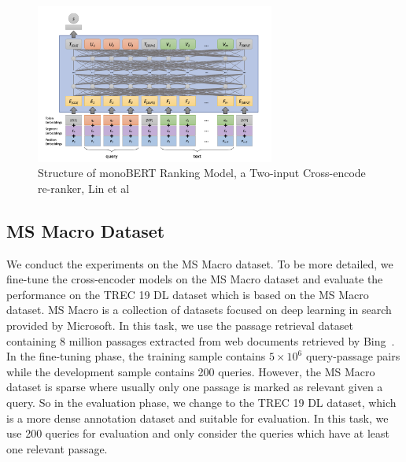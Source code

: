 \documentclass[acmsmall]{acmart}
\begin{document}
\begin{figure}[H]
    \centering
    \includegraphics[width=0.7\textwidth]
    {report/cross-encoder.png}
    \caption{Structure of monoBERT Ranking Model, a Two-input Cross-encode re-ranker, Lin et al}
    \label{fig:cross-encoder}
\end{figure}
\subsection{MS Macro Dataset}
We conduct the experiments on the MS Macro dataset. To be more detailed, we fine-tune the cross-encoder models on the MS Macro dataset and evaluate the performance on the TREC 19 DL dataset which is based on the MS Macro dataset. MS Macro is a collection of datasets focused on deep learning in search provided by Microsoft. In this task, we use the passage retrieval dataset containing 8 million passages extracted from web documents retrieved by Bing~\cite{msmarco}. In the fine-tuning phase, the training sample contains $5\times10^6$ query-passage pairs while the development sample contains 200 queries. However, the MS Macro dataset is sparse where usually only one passage is marked as relevant given a query. So in the evaluation phase, we change to the TREC 19 DL dataset,  which is a more dense annotation dataset and suitable for evaluation. In this task, we use 200 queries for evaluation and only consider the queries which have at least one relevant passage.
\end{document}
